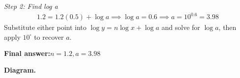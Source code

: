 \documentclass[11pt]{article}
\begin{document}
\textit{Step 2: Find log a}
\[\begin{gathered}
1.2 = 1.2(0.5) + \log a \implies \log a = 0.6 \implies a = 10^{0.6} = 3.98
\end{gathered}\]
Substitute either point into \( \log y = n\log x + \log a \) and solve for \( \log a \), then apply \( 10^{\square} \) to recover \( a \).

\begin{answerbox}
\textbf{Final answer:}\quad \(\displaystyle n = 1.2, a = 3.98\)
\end{answerbox}
\textbf{Diagram.}

\begin{center}
\end{center}
\end{document}
